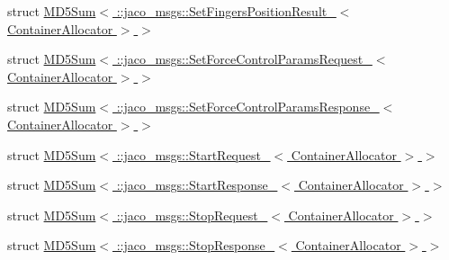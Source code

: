 \begin{DoxyCompactItemize}
\item 
struct \hyperlink{structros_1_1message__traits_1_1MD5Sum_3_01_1_1jaco__msgs_1_1SetFingersPositionResult___3_01ContainerAllocator_01_4_01_4}{M\+D5\+Sum$<$ \+::jaco\+\_\+msgs\+::\+Set\+Fingers\+Position\+Result\+\_\+$<$ Container\+Allocator $>$ $>$}
\item 
struct \hyperlink{structros_1_1message__traits_1_1MD5Sum_3_01_1_1jaco__msgs_1_1SetForceControlParamsRequest___3_01ContainerAllocator_01_4_01_4}{M\+D5\+Sum$<$ \+::jaco\+\_\+msgs\+::\+Set\+Force\+Control\+Params\+Request\+\_\+$<$ Container\+Allocator $>$ $>$}
\item 
struct \hyperlink{structros_1_1message__traits_1_1MD5Sum_3_01_1_1jaco__msgs_1_1SetForceControlParamsResponse___3_01ContainerAllocator_01_4_01_4}{M\+D5\+Sum$<$ \+::jaco\+\_\+msgs\+::\+Set\+Force\+Control\+Params\+Response\+\_\+$<$ Container\+Allocator $>$ $>$}
\item 
struct \hyperlink{structros_1_1message__traits_1_1MD5Sum_3_01_1_1jaco__msgs_1_1StartRequest___3_01ContainerAllocator_01_4_01_4}{M\+D5\+Sum$<$ \+::jaco\+\_\+msgs\+::\+Start\+Request\+\_\+$<$ Container\+Allocator $>$ $>$}
\item 
struct \hyperlink{structros_1_1message__traits_1_1MD5Sum_3_01_1_1jaco__msgs_1_1StartResponse___3_01ContainerAllocator_01_4_01_4}{M\+D5\+Sum$<$ \+::jaco\+\_\+msgs\+::\+Start\+Response\+\_\+$<$ Container\+Allocator $>$ $>$}
\item 
struct \hyperlink{structros_1_1message__traits_1_1MD5Sum_3_01_1_1jaco__msgs_1_1StopRequest___3_01ContainerAllocator_01_4_01_4}{M\+D5\+Sum$<$ \+::jaco\+\_\+msgs\+::\+Stop\+Request\+\_\+$<$ Container\+Allocator $>$ $>$}
\item 
struct \hyperlink{structros_1_1message__traits_1_1MD5Sum_3_01_1_1jaco__msgs_1_1StopResponse___3_01ContainerAllocator_01_4_01_4}{M\+D5\+Sum$<$ \+::jaco\+\_\+msgs\+::\+Stop\+Response\+\_\+$<$ Container\+Allocator $>$ $>$}
\end{DoxyCompactItemize}
